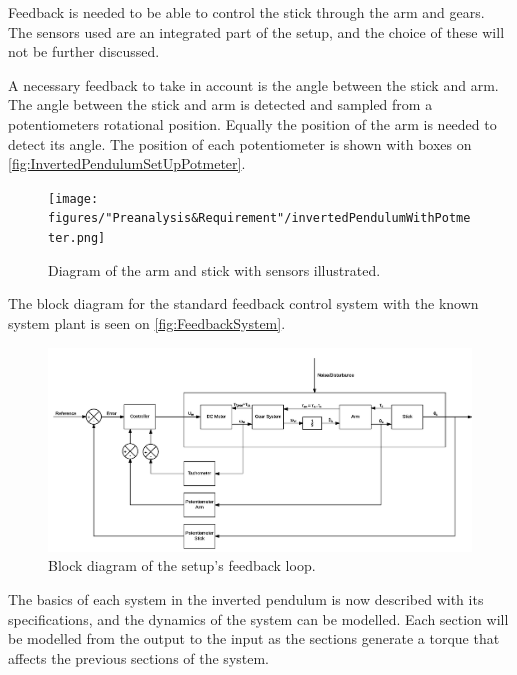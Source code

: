 Feedback is needed to be able to control the stick through the arm and gears. The sensors used are an integrated part of the setup, and the choice of these will not be further discussed.

A necessary feedback to take in account is the angle between the stick and arm. The angle between the stick and arm is detected and sampled from a potentiometers rotational position. Equally the position of the arm is needed to detect its angle. The position of each potentiometer is shown with boxes on \autoref{fig:InvertedPendulumSetUpPotmeter}. 

\begin{figure} [htbp]
	\centering
	\texttt{[image: figures/"Preanalysis\&Requirement"/invertedPendulumWithPotmeter.png]}
	\caption{Diagram of the arm and stick with sensors illustrated.} \label{fig:InvertedPendulumSetUpPotmeter}
\end{figure}
\newpage
The block diagram for the standard feedback control system with the known system plant is seen on \autoref{fig:FeedbackSystem}. 

\begin{figure}[htbp]
\hspace*{0.5 cm} 
	\centerline{
	\includegraphics[width=0.95\paperwidth]{figures/modeling/MechanicalSystem}}
	\caption{Block diagram of the setup's feedback loop.} \label{fig:FeedbackSystem}
	
\end{figure}


The basics of each system in the inverted pendulum is now described with its specifications, and the dynamics of the system can be modelled. Each section will be modelled from the output to the input as the sections generate a torque that affects the previous sections of the system.

\newpage
